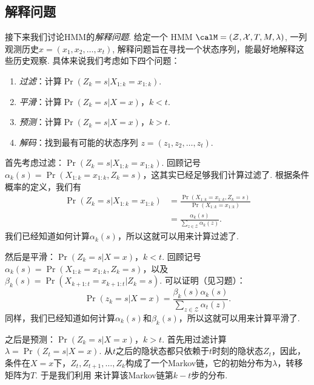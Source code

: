 \subsection{解释问题}
接下来我们讨论HMM的\emph{解释问题}. 给定一个 HMM $\calM = (\mathcal Z, \mathcal X, T, M, \lambda)$, 一列观测历史$x = (x_1, x_2, \dots, x_t)$, 解释问题旨在寻找一个状态序列，能最好地解释这些历史观察. 具体来说我们考虑如下四个问题：
\begin{enumerate}
    \item \emph{过滤}：计算$\Pr(Z_k = s|X_{1:k}=x_{1:k})$.
    \item \emph{平滑}：计算$\Pr(Z_k = s|X=x)$，$k < t$.
    \item \emph{预测}：计算$\Pr(Z_k = s|X=x)$，$k > t$.
    \item \emph{解码}：找到最有可能的状态序列 $z = (z_1, z_2, \dots, z_t)$.
\end{enumerate}

首先考虑过滤：$\Pr(Z_k = s|X_{1:k}=x_{1:k})$. 回顾记号$\alpha_k(s)= \Pr(X_{1:k}=x_{1:k}, Z_k=s)$，这其实已经足够我们计算过滤了. 根据条件概率的定义，我们有
\begin{align*}
    \Pr(Z_k = s|X_{1:k}=x_{1:k}) & = \frac{\Pr(X_{1:k}=x_{1:k}, Z_k=s)}{\Pr(X_{1:k}=x_{1:k})} \\
    &= \frac{\alpha_k(s)}{\sum_{z\in\mathcal Z}\alpha_k(z)}.
\end{align*}
我们已经知道如何计算$\alpha_k(s)$，所以这就可以用来计算过滤了.

然后是平滑：$\Pr(Z_k = s|X=x)$，$k < t$.  回顾记号$\alpha_k(s)= \Pr(X_{1:k}=x_{1:k}, Z_k=s)$，以及$\beta_k(s)=\Pr(X_{k+1:t}=x_{k+1:t} |Z_k=s)$. 可以证明（见习题）：
\begin{equation}
    \Pr(z_k = s|X=x)=\frac{\beta_k(s)\alpha_k(s)}{\sum_{z\in\mathcal Z}\alpha_t(z)}.\label{eq:smooth}
\end{equation}
同样，我们已经知道如何计算$\alpha_k(s)$和$\beta_k(s)$，所以这就可以用来计算平滑了.

之后是预测：$\Pr(Z_k = s|X=x)$，$k > t$. 首先用过滤计算 $\lambda=\Pr(Z_t = s|X=x)$. 从$t$之后的隐状态都只依赖于$t$时刻的隐状态$Z_t$，因此，条件在$X=x$下，$Z_t,Z_{t+1},\dots,Z_k$构成了一个Markov链，它的初始分布为$\lambda$，转移矩阵为$T$. 于是我们利用 来计算该Markov链第$k-t$步的分布.

